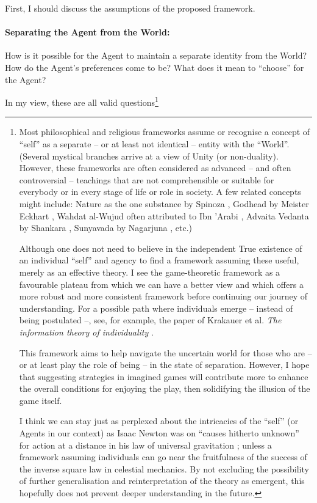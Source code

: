 \documentclass{article}
\begin{document}
First, I should discuss the assumptions of the proposed framework.

\paragraph{Separating the Agent from the World:}
How is it possible for the Agent to maintain a separate identity from the World? How do the Agent's preferences come to be? What does it mean to ``choose'' for the Agent?

In my view, these are all valid questions\footnote{
Most philosophical and religious frameworks assume or recognise a concept of ``self'' \cite{sep:Identity,book:WorldsReligions,book:FunfWeltreligionen} as a separate -- or at least not identical -- entity with the ``World''.
(Several mystical branches arrive at a view of Unity (or non-duality). However, these frameworks are often considered as advanced -- and often controversial -- teachings that are not comprehensible or suitable for everybody or in every stage of life or role in society. A few related concepts might include: Nature as the one substance by Spinoza \cite{book:SpinozaEthics, sep:SpinozaPhysics}, Godhead by Meister Eckhart \cite{book:RoyceEckhart,sep:Eckhart,book:Eckhart}, Wahdat al-Wujud often attributed to Ibn 'Arabi \cite{sep:IbnArabi,book:HistoryOfIslamicPhilosophy,book:IbnArabi}, Advaita Vedanta by Shankara \cite{sep:Shankara,book:AdvaitaVedanta}, Sunyavada by Nagarjuna \cite{sep:Nagarjuna,book:Nagarjuna}, etc.)

Although one does not need to believe in the independent True existence of an individual ``self'' and agency to find a framework assuming these useful, merely as an effective theory. 
I see the game-theoretic framework as a favourable plateau from which we can have a better view and which offers a more robust and more consistent framework before continuing our journey of understanding.
For a possible path where individuals emerge -- instead of being postulated --, see, for example, the paper of Krakauer et al. \emph{The information theory of individuality}  \cite{paper:Individuality}.

This framework aims to help navigate the uncertain world for those who are -- or at least play the role of being -- in the state of separation. However, I hope that suggesting strategies in imagined games will contribute more to enhance the overall conditions for enjoying the play, then solidifying the illusion of the game itself.

I think we can stay just as perplexed about the intricacies of the ``self'' (or Agents in our context) as Isaac Newton was on ``causes hitherto unknown'' \cite{book:Principia, book:Principia1848, sep:Principia} for action at a distance in his law of universal gravitation \cite{book:CorrespondenceOfIsaacNewton,paper:NewtonOnActionAtADistance}; unless a framework assuming individuals can go near the fruitfulness of the success of the inverse square law in celestial mechanics. By not excluding the possibility of further generalisation and reinterpretation of the theory as emergent, this hopefully does not prevent deeper understanding in the future.
}
\end{document}
